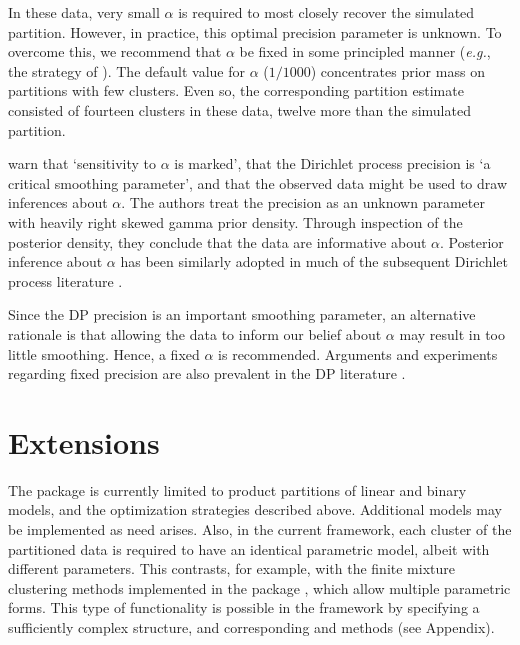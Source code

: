 \documentclass[article, nojss]{jss}
\begin{document}
In these data, very small $\alpha$ is required to most closely recover the simulated partition. However, in practice, this optimal precision parameter is unknown. To overcome this, we recommend that $\alpha$ be fixed in some principled manner ({\it e.g.}, the strategy of \citet{ShotwellSlate2011}). The default value for $\alpha$ ($1/1000$) concentrates prior mass on partitions with few clusters. Even so, the corresponding partition estimate consisted of fourteen clusters in these data, twelve more than the simulated partition.

\citet{EscobarWest1995} warn that `sensitivity to $\alpha$ is marked', that the Dirichlet process precision is `a critical smoothing parameter', and that the observed data might be used to draw inferences about $\alpha$. The authors treat the precision as an unknown parameter with heavily right skewed gamma prior density. Through inspection of the posterior density, they conclude that the data are informative about $\alpha$. Posterior inference about $\alpha$ has been similarly adopted in much of the subsequent Dirichlet process literature \citep{BleiJordan2006,DunsonXueCarin2008,RodriguezDunsonGelfand2009,WangDunson2010}.

Since the DP precision is an important smoothing parameter, an alternative rationale is that allowing the data to inform our belief about $\alpha$ may result in too little smoothing. Hence, a fixed $\alpha$ is recommended. Arguments and experiments regarding fixed precision are also prevalent in the DP literature \citep{BushMacEachern1996, Daume2007, DunsonPark2008}. 

\section[Extensions]{Extensions} \label{Extensions}
The  package is currently limited to product partitions of linear and binary models, and the optimization strategies described above. Additional models may be implemented as need arises. Also, in the current framework, each cluster of the partitioned data is required to have an identical parametric model, albeit with different parameters. This contrasts, for example, with the finite mixture clustering methods implemented in the  package \citep{flexmix2008}, which allow multiple parametric forms. This type of functionality is possible in the  framework by specifying a sufficiently complex  structure, and corresponding  and  methods (see Appendix).
\end{document}
